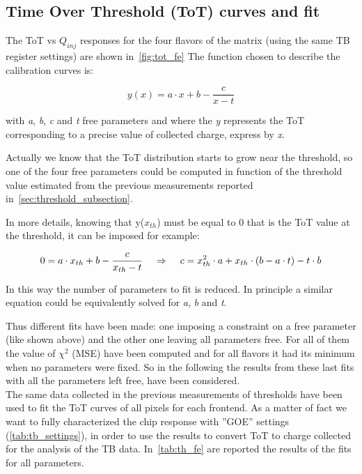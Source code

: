 \subsection{Time Over Threshold (ToT) curves and fit} \label{sec:tot_fit}

The ToT vs $Q_{inj}$ responses for the four flavors of the matrix (using the same TB register settings) are shown in~\autoref{fig:tot_fe}
The function chosen to describe the calibration curves is:

\begin{equation}
y(x) = a\cdot x +b -\frac{c}{x-t}
\label{eq:fit_function}
\end{equation}

with \textit{a}, \textit{b}, \textit{c} and \textit{t} free parameters and where the \textit{y} represents the ToT corresponding to a precise value of collected charge, express by \textit{x}. 

Actually we know that the ToT distribution starts to grow near the threshold, so one of the four free parameters could be computed in function of the threshold value estimated from the previous measurements reported in~\autoref{sec:threshold_subsection}.

In more details, knowing that y($x_{th}$) must be equal to 0 that is the ToT value at the threshold, it can be imposed for example:

\begin{equation}
0 = a\cdot x_{th} + b - \frac{c}{x_{th}-t}  \hspace{.4cm}	\Rightarrow  \hspace{.4cm}	c = x_{th}^{2}\cdot a + x_{th}\cdot (b-a\cdot t) - t\cdot b
\end{equation}

In this way the number of parameters to fit is reduced. In principle a similar equation could be equivalently solved for \textit{a}, \textit{b} and \textit{t}. 


Thus different fits have been made: one imposing a constraint on a free parameter (like shown above) and the other one leaving all parameters free. For all of them the value of $\chi^{2}$ (MSE) have been computed and for all flavors it had its minimum when no parameters were fixed. So in the following the results from these last fits with all the parameters left free, have been considered.\\

The same data collected in the previous measurements of thresholds have been used to fit the ToT curves of all pixels for each frontend. As a matter of fact we want to fully characterized the chip response with ''GOE'' settings (\autoref{tab:tb_settings}), in order to use the results to convert ToT to charge collected for the analysis of the TB data.
In~\autoref{tab:th_fe} are reported the results of the fits for all parameters.

